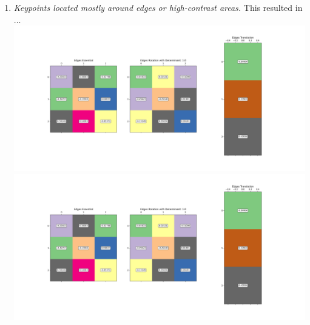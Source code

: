 \documentclass[11pt]{article}
\begin{document}
\begin{itemize}
\begin{enumerate}
            \item \textit{Keypoints located mostly around edges or high-contrast areas.}\newline
            This resulted in$\ldots$\newline
            \includegraphics[width=\textwidth]{Output Pictures/Edges Lines}\newline
            \includegraphics[width=\textwidth]{Output Pictures/Edges Matrices}\newline


\end{enumerate}
\end{itemize}
\end{document}
